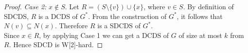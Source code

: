 \begin{proof}
\textit{Case 2:} $x \notin S$. Let $R= (S\setminus \lbrace v \rbrace) \cup \lbrace x \rbrace $, where $v \in S$. By definition of SDCDS, $R$ is a DCDS of $G^*$. From the construction of $G^*$, it follows that $N(v) \subseteq N(x)$. Therefore $R$ is a SDCDS of $G^*$.\\
Since $x \in R$, by applying Case 1 we can get a DCDS of $G$ of size at most $k$ from $R$. Hence SDCD is W[2]-hard.
\end{proof}

